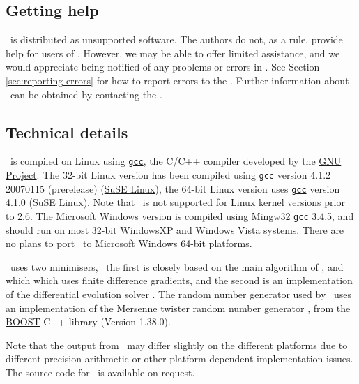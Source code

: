 \subsection{Getting help}

\SPM\ is distributed as unsupported software. The authors do not, as a rule, provide help for users of \SPM. However, we may be able to offer limited assistance, and we would appreciate being notified of any problems or errors in \SPM. See Section \ref{sec:reporting-errors} for how to report errors to the \authors. Further information about \SPM\ can be obtained by contacting the \authors.

\subsection{Technical details}

\SPM\ is compiled on Linux using \href{http://gcc.gnu.org}{\texttt{gcc}}, the C/C++ compiler developed by the \href{http://gcc.gnu.org}{GNU Project}. The 32-bit Linux version has been compiled using \texttt{gcc} version 4.1.2 20070115 (prerelease) (\href{http://www.opensuse.org/}{SuSE Linux}), the 64-bit Linux version uses \href{http://gcc.gnu.org}{\texttt{gcc}} version 4.1.0 (\href{http://www.opensuse.org/}{SuSE Linux}). Note that \SPM\ is not supported for Linux kernel versions prior to 2.6. The \href{http://www.microsoft.com}{Microsoft Windows} version is compiled using \href{http://www.mingw.org}{Mingw32} \href{http://gcc.gnu.org}{\texttt{gcc}} 3.4.5, and should run on most 32-bit WindowsXP and Windows Vista systems. There are no plans to port \SPM\ to Microsoft Windows 64-bit platforms. 

\SPM\ uses two minimisers, \textemdash\ the first is closely based on the main algorithm of \cite{779}, and which which uses finite difference gradients, and the second is an implementation of the differential evolution solver \citep{1442}. The random number generator used by \SPM\ uses an implementation of the Mersenne twister random number generator \citep{796}, from the \href{http://www.boost.org/}{BOOST} C++ library (Version 1.38.0).

Note that the output from \SPM\ may differ slightly on the different platforms due to different precision arithmetic or other platform dependent implementation issues. The source code for \SPM\ is available on request.


